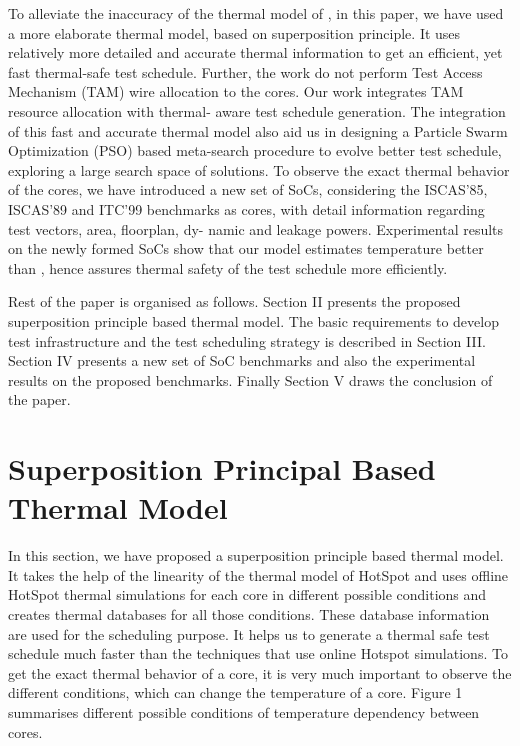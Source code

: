 \documentclass[conference]{IEEEtran}
\begin{document}
	\par
	To alleviate the inaccuracy of the thermal model of \cite{yao2011power}, in
this paper, we have used a more elaborate thermal model, based
on superposition principle. It uses relatively more detailed
and accurate thermal information to get an efficient, yet fast
thermal-safe test schedule. Further, the work \cite{yao2011power} do not perform
Test Access Mechanism (TAM) wire allocation to the cores.
Our work integrates TAM resource allocation with thermal-
aware test schedule generation. The integration of this fast
and accurate thermal model also aid us in designing a Particle
Swarm Optimization (PSO) \cite{kennedy2011particle} based meta-search procedure
to evolve better test schedule, exploring a large search space
of solutions. To observe the exact thermal behavior of the
cores, we have introduced a new set of SoCs, considering the
ISCAS’85, ISCAS’89 and ITC’99 benchmarks as cores, with
detail information regarding test vectors, area, floorplan, dy-
namic and leakage powers. Experimental results on the newly
formed SoCs show that our model estimates temperature better
than \cite{yao2011power}, hence assures thermal safety of the test schedule more
efficiently.\\

	\par
	Rest of the paper is organised as follows. Section II
presents the proposed superposition principle based thermal
model. The basic requirements to develop test infrastructure
and the test scheduling strategy is described in Section III.
Section IV presents a new set of SoC benchmarks and also
the experimental results on the proposed benchmarks. Finally
Section V draws the conclusion of the paper.\\


	\section{Superposition Principal Based Thermal Model}
	
	In this section, we have proposed a superposition principle
based thermal model. It takes the help of the linearity of the
thermal model of HotSpot and uses offline HotSpot \cite{stan2003hotspot} thermal
simulations for each core in different possible conditions
and creates thermal databases for all those conditions. These
database information are used for the scheduling purpose. It
helps us to generate a thermal safe test schedule much faster
than the techniques that use online Hotspot simulations. To get
the exact thermal behavior of a core, it is very much important
to observe the different conditions, which can change the
temperature of a core. Figure 1 summarises different possible
conditions of temperature dependency between cores.
\end{document}
